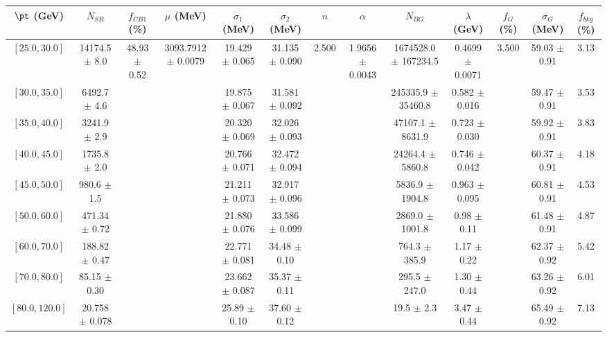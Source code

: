 \begin{tabular}{c||c|c|c|c|c|c|c|c|c|c|c||c}
$\pt$ (GeV) & $N_{SR}$ & $f_{CB1}$ (\%) & $\mu$ (MeV) & $\sigma_1$ (MeV) & $\sigma_2$ (MeV) & $n$ & $\alpha$ & $N_{BG}$ & $\lambda$ (GeV) & $f_G$ (\%) & $\sigma_G$ (MeV) & $f_{bkg}$ (\%) \\
\hline
$[25.0, 30.0]$ & 14174.5 $\pm$ 8.0 & \multirow{9}{*}{48.93 $\pm$ 0.52} & \multirow{9}{*}{3093.7912 $\pm$ 0.0079} & 19.429 $\pm$ 0.065 & 31.135 $\pm$ 0.090 & \multirow{9}{*}{2.500} & \multirow{9}{*}{1.9656 $\pm$ 0.0043} & 1674528.0 $\pm$ 167234.5 & 0.4699 $\pm$ 0.0071 & \multirow{9}{*}{3.500} & 59.03 $\pm$ 0.91 & 3.13\\
$[30.0, 35.0]$ & 6492.7 $\pm$ 4.6 &  &  & 19.875 $\pm$ 0.067 & 31.581 $\pm$ 0.092 &  &  & 245335.9 $\pm$ 35460.8 & 0.582 $\pm$ 0.016 &  & 59.47 $\pm$ 0.91 & 3.53\\
$[35.0, 40.0]$ & 3241.9 $\pm$ 2.9 &  &  & 20.320 $\pm$ 0.069 & 32.026 $\pm$ 0.093 &  &  & 47107.1 $\pm$ 8631.9 & 0.723 $\pm$ 0.030 &  & 59.92 $\pm$ 0.91 & 3.83\\
$[40.0, 45.0]$ & 1735.8 $\pm$ 2.0 &  &  & 20.766 $\pm$ 0.071 & 32.472 $\pm$ 0.094 &  &  & 24264.4 $\pm$ 5860.8 & 0.746 $\pm$ 0.042 &  & 60.37 $\pm$ 0.91 & 4.18\\
$[45.0, 50.0]$ & 980.6 $\pm$ 1.5 &  &  & 21.211 $\pm$ 0.073 & 32.917 $\pm$ 0.096 &  &  & 5836.9 $\pm$ 1904.8 & 0.963 $\pm$ 0.095 &  & 60.81 $\pm$ 0.91 & 4.53\\
$[50.0, 60.0]$ & 471.34 $\pm$ 0.72 &  &  & 21.880 $\pm$ 0.076 & 33.586 $\pm$ 0.099 &  &  & 2869.0 $\pm$ 1001.8 & 0.98 $\pm$ 0.11 &  & 61.48 $\pm$ 0.91 & 4.87\\
$[60.0, 70.0]$ & 188.82 $\pm$ 0.47 &  &  & 22.771 $\pm$ 0.081 & 34.48 $\pm$ 0.10 &  &  & 764.3 $\pm$ 385.9 & 1.17 $\pm$ 0.22 &  & 62.37 $\pm$ 0.92 & 5.42\\
$[70.0, 80.0]$ & 85.15 $\pm$ 0.30 &  &  & 23.662 $\pm$ 0.087 & 35.37 $\pm$ 0.11 &  &  & 295.5 $\pm$ 247.0 & 1.30 $\pm$ 0.44 &  & 63.26 $\pm$ 0.92 & 6.01\\
$[80.0, 120.0]$ & 20.758 $\pm$ 0.078 &  &  & 25.89 $\pm$ 0.10 & 37.60 $\pm$ 0.12 &  &  & 19.5 $\pm$ 2.3 & 3.47 $\pm$ 0.44 &  & 65.49 $\pm$ 0.92 & 7.13\\
\end{tabular}
